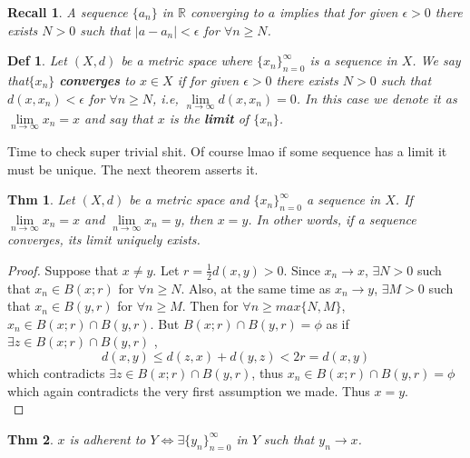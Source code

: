 \documentclass[paper=a4, fontsize=11pt]{scrartcl}
\newtheorem{theorem}{Thm}
\newtheorem{definition}{Def}
\newtheorem*{recall}{Recall}
\begin{document}
\begin{recall}
	A sequence $\{a_n\}$ in $\mathbb{R}$ converging to $a$ implies that for given $\epsilon >0$ there exists $N>0$ such that $|a-a_n|<\epsilon$ for $\forall n\geq N$.\\
\end{recall}

\begin{definition}
	Let $(X,d)$ be a metric space where $\{x_n\}^\infty_{n=0}$ is a sequence in $X$. We say that$\{x_n\}$ \textbf{converges} to $x \in X$ if for given $\epsilon>0$ there exists $N>0$ such that $d(x,x_n)<\epsilon$ for $\forall n\geq N$, i.e, $\lim\limits_{n \to \infty} d(x,x_n)=0$. In this case we denote it as $\lim\limits_{n \to \infty} x_n = x$ and say that $x$ is the \textbf{limit} of $\{x_n\}$.  \\
\end{definition}

Time to check super trivial shit. Of course lmao if some sequence has a limit it must be unique. The next theorem asserts it.\\

\begin{theorem}
	Let $(X,d)$ be a metric space and $\{x_n\}^\infty_{n=0}$ a sequence in $X$. If $\lim\limits_{n \to \infty} x_n = x$ and $\lim\limits_{n \to \infty} x_n = y$, then $x=y$. In other words, if a sequence converges, its limit uniquely exists.\\
\end{theorem}

\begin{proof}
	Suppose that $x \neq y$. Let $r=\frac{1}{2} d(x,y) >0$. Since $x_n \to x$, $\exists N>0$ such that $x_n \in B(x;r)$ for $\forall n \geq N$. Also, at the same time as $x_n \to y$, $\exists M>0$ such that $x_n \in B(y,r)$ for $\forall n \geq M$. Then for $\forall n \geq max\{N,M\}$, $x_n \in B(x;r)\cap B(y,r)$. But $B(x;r)\cap B(y,r)=\phi$ as if $\exists z \in B(x;r)\cap B(y,r)$ ,
	\begin{equation} \nonumber
		d(x,y) \leq d(z,x) + d(y,z) < 2r = d(x,y)
	\end{equation} 
	which contradicts $\exists z \in B(x;r)\cap B(y,r)$, thus $x_n \in B(x;r)\cap B(y,r)=\phi$ which again contradicts the very first assumption we made. Thus $x=y$.\\
\end{proof}

\begin{theorem}
	$x$ is adherent to $Y \iff \exists \{y_n\}^\infty_{n=0}$ in $Y$ such that $y_n \to x$.\\
\end{theorem}
\end{document}
